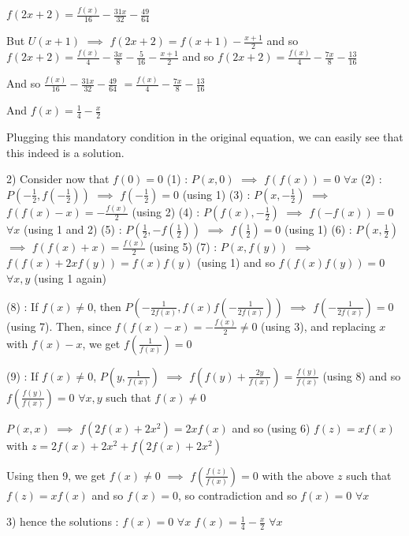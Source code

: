 \begin{solution}
$ f(2x+2)=\frac{f(x)}{16}-\frac{31x}{32}-\frac {49}{64}$

But $ U(x+1)$ $ \implies$ $ f(2x+2)=f(x+1)-\frac {x+1}2$ and so $ f(2x+2)=\frac{f(x)}4-\frac{3x}8-\frac 5{16}-\frac {x+1}2$ and so $ f(2x+2)=\frac{f(x)}4-\frac{7x}8-\frac {13}{16}$ 

And so $ \frac{f(x)}{16}-\frac{31x}{32}-\frac {49}{64}$ $ =\frac{f(x)}4-\frac{7x}8-\frac {13}{16}$

And $ f(x)=\frac 14-\frac{x}{2}$

Plugging this mandatory condition in the original equation, we can easily see that this indeed is a solution.

2) Consider now that $ f(0)=0$
(1) : $ P(x,0)$ $ \implies$ $ f(f(x))=0$ $ \forall x$
(2) : $ P(-\frac 12,f(-\frac 12))$ $ \implies$ $ f(-\frac 12)=0$ (using 1)
(3) : $ P(x,-\frac 12)$ $ \implies$ $ f(f(x)-x)=-\frac{f(x)}{2}$ (using 2)
(4) : $ P(f(x),-\frac 12)$ $ \implies$ $ f(-f(x))=0$ $ \forall x$ (using 1 and 2)
(5) : $ P(\frac 12,-f(\frac 12))$ $ \implies$ $ f(\frac 12)=0$ (using 1)
(6) : $ P(x,\frac 12)$ $ \implies$ $ f(f(x)+x)=\frac{f(x)}2$ (using 5)
(7) : $ P(x,f(y))$ $ \implies$ $ f(f(x)+2xf(y))=f(x)f(y)$ (using 1) and so $ f(f(x)f(y))=0$ $ \forall x,y$ (using 1 again)

(8) : If $ f(x)\neq 0$, then $ P(-\frac{1}{2f(x)},f(x)f(-\frac{1}{2f(x)}))$ $ \implies$ $ f(-\frac{1}{2f(x)})=0$ (using 7). Then, since $ f(f(x)-x)=-\frac{f(x)}{2}\neq 0$ (using 3), and replacing $ x$ with $ f(x)-x$, we get $ f(\frac{1}{f(x)})=0$

(9) : If $ f(x)\neq 0$, $ P(y,\frac{1}{f(x)})$ $ \implies$ $ f(f(y)+\frac{2y}{f(x)})=\frac{f(y)}{f(x)}$ (using 8) and so $ f(\frac{f(y)}{f(x)})=0$ $ \forall x,y$ such that $ f(x)\neq 0$

$ P(x,x)$ $ \implies$ $ f(2f(x)+2x^2)=2xf(x)$ and so (using 6) $ f(z)=xf(x)$ with $ z=2f(x)+2x^2+f(2f(x)+2x^2)$

Using then 9, we get $ f(x)\neq 0$ $ \implies$ $ f(\frac{f(z)}{f(x)})=0$ with the above $ z$ such that $ f(z)=xf(x)$ and so $ f(x)=0$, so contradiction and so $ f(x)=0$ $ \forall x$

3) hence the solutions :
$ f(x)=0$ $ \forall x$
$ f(x)=\frac 14-\frac{x}{2}$ $ \forall x$
\end{solution}



